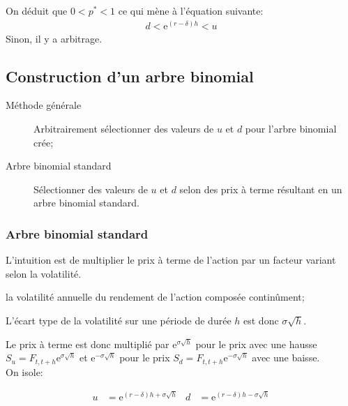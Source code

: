 \documentclass[10pt, french]{article}
\begin{document}
\begin{multicols*}{2}
On déduit que $0 < p^{*} < 1$ ce qui mène à l'équation suivante:
	\begin{align*}
	d < \textrm{e}^{(r - \delta)h} < u
	\end{align*}
Sinon, il y a arbitrage.

\columnbreak
\subsection{Construction d'un arbre binomial}

\begin{description}
	\item[Méthode générale]	Arbitrairement sélectionner des valeurs de $u$ et $d$ pour l'arbre binomial crée;
	\item[Arbre binomial standard]	Sélectionner des valeurs de $u$ et $d$ selon des prix à terme résultant en un arbre binomial standard.
\end{description}

\subsubsection*{Arbre binomial standard}
L'intuition est de multiplier le prix à terme de l'action par un facteur variant selon la volatilité.

\begin{distributions}[Notation]
\begin{description}[leftmargin = *]
	\item[$\sigma$]	la volatilité annuelle du rendement de l'action composée continûment;
	\item[]	L'écart type de la volatilité sur une période de durée $h$ est donc $\sigma \sqrt{h}$.
\end{description}
\end{distributions}

Le prix à terme est donc multiplié par $\textrm{e}^{\sigma \sqrt{h}}$ pour le prix avec une hausse $S_{u} = F_{t, t + h}\textrm{e}^{\sigma \sqrt{h}}$ et $\textrm{e}^{-\sigma \sqrt{h}}$ pour le prix $S_{d} = F_{t, t + h}\textrm{e}^{-\sigma \sqrt{h}}$ avec une baisse.\\

On isole:
\begin{rappel}{}
	\begin{align*}
	u	&=	\textrm{e}^{(r - \delta)h + \sigma \sqrt{h}}	&
	d	&=	\textrm{e}^{(r - \delta)h - \sigma \sqrt{h}}
	\end{align*}
\end{rappel}


\end{multicols*}
\end{document}
